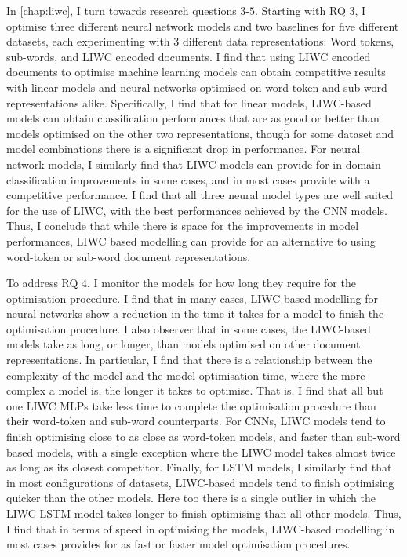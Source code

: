 In \cref{chap:liwc}, I turn towards research questions $3$-$5$.
Starting with RQ 3, I optimise three different neural network models and two baselines for five different datasets, each experimenting with 3 different data representations: Word tokens, sub-words, and LIWC encoded documents.
I find that using LIWC encoded documents to optimise machine learning models can obtain competitive results with linear models and neural networks optimised on word token and sub-word representations alike.
Specifically, I find that for linear models, LIWC-based models can obtain classification performances that are as good or better than models optimised on the other two representations, though for some dataset and model combinations there is a significant drop in performance.
For neural network models, I similarly find that LIWC models can provide for in-domain classification improvements in some cases, and in most cases provide with a competitive performance.
I find that all three neural model types are well suited for the use of LIWC, with the best performances achieved by the CNN models.
Thus, I conclude that while there is space for the improvements in model performances, LIWC based modelling can provide for an alternative to using word-token or sub-word document representations.

To address RQ 4, I monitor the models for how long they require for the optimisation procedure.
I find that in many cases, LIWC-based modelling for neural networks show a reduction in the time it takes for a model to finish the optimisation procedure.
I also observer that in some cases, the LIWC-based models take as long, or longer, than models optimised on other document representations.
In particular, I find that there is a relationship between the complexity of the model and the model optimisation time, where the more complex a model is, the longer it takes to optimise.
That is, I find that all but one LIWC MLPs take less time to complete the optimisation procedure than their word-token and sub-word counterparts.
For CNNs, LIWC models tend to finish optimising close to as close as word-token models, and faster than sub-word based models, with a single exception where the LIWC model takes almost twice as long as its closest competitor.
Finally, for LSTM models, I similarly find that in most configurations of datasets, LIWC-based models tend to finish optimising quicker than the other models.
Here too there is a single outlier in which the LIWC LSTM model takes longer to finish optimising than all other models.
Thus, I find that in terms of speed in optimising the models, LIWC-based modelling in most cases provides for as fast or faster model optimisation procedures.

